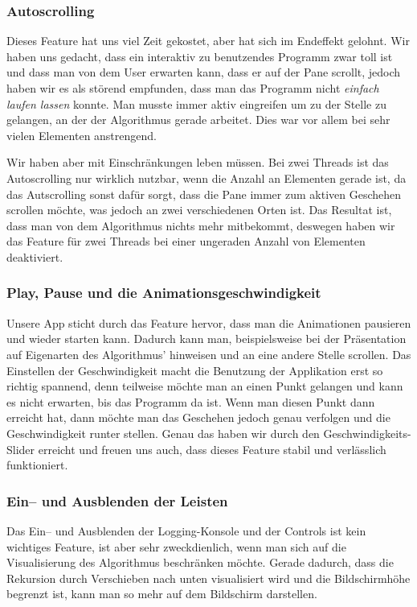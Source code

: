 \subsubsection{Autoscrolling}
Dieses Feature hat uns viel Zeit gekostet, aber hat sich im Endeffekt gelohnt. Wir haben uns gedacht, dass ein interaktiv zu benutzendes Programm zwar toll ist und dass man von dem User erwarten kann, dass er auf der Pane scrollt, jedoch haben wir es als störend empfunden, dass man das Programm nicht \textit{einfach laufen lassen} konnte. Man musste immer aktiv eingreifen um zu der Stelle zu gelangen, an der der Algorithmus gerade arbeitet. Dies war vor allem bei sehr vielen Elementen anstrengend.

Wir haben aber mit Einschränkungen leben müssen. Bei zwei Threads ist das Autoscrolling nur wirklich nutzbar, wenn die Anzahl an Elementen gerade ist, da das Autscrolling sonst dafür sorgt, dass die Pane immer zum aktiven Geschehen scrollen möchte, was jedoch an zwei verschiedenen Orten ist. Das Resultat ist, dass man von dem Algorithmus nichts mehr mitbekommt, deswegen haben wir das Feature für zwei Threads bei einer ungeraden Anzahl von Elementen deaktiviert.

\subsubsection{Play, Pause und die Animationsgeschwindigkeit}
Unsere App sticht durch das Feature hervor, dass man die Animationen pausieren und wieder starten kann. Dadurch kann man, beispielsweise bei der Präsentation auf Eigenarten des Algorithmus' hinweisen und an eine andere Stelle scrollen. Das Einstellen der Geschwindigkeit macht die Benutzung der Applikation erst so richtig spannend, denn teilweise möchte man an einen Punkt gelangen und kann es nicht erwarten, bis das Programm da ist. Wenn man diesen Punkt dann erreicht hat, dann möchte man das Geschehen jedoch genau verfolgen und die Geschwindigkeit runter stellen. Genau das haben wir durch den Geschwindigkeits-Slider erreicht und freuen uns auch, dass dieses Feature stabil und verlässlich funktioniert.

\subsubsection{Ein-- und Ausblenden der Leisten}
Das Ein-- und Ausblenden der Logging-Konsole und der Controls ist kein wichtiges Feature, ist aber sehr zweckdienlich, wenn man sich auf die Visualisierung des Algorithmus beschränken möchte. Gerade dadurch, dass die Rekursion durch Verschieben nach unten visualisiert wird und die Bildschirmhöhe begrenzt ist, kann man so mehr auf dem Bildschirm darstellen.

